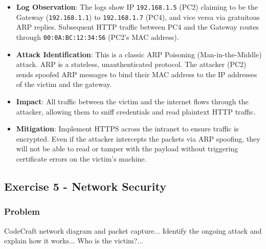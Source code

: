 \documentclass{article}
\begin{document}
\begin{itemize}
    \item \textbf{Log Observation}: The logs show IP \texttt{192.168.1.5} (PC2) claiming to be the Gateway (\texttt{192.168.1.1}) to \texttt{192.168.1.7} (PC4), and vice versa via gratuitous ARP replies. Subsequent HTTP traffic between PC4 and the Gateway routes through \texttt{00:0A:BC:12:34:56} (PC2's MAC address).
    \item \textbf{Attack Identification}: This is a classic ARP Poisoning (Man-in-the-Middle) attack. ARP is a stateless, unauthenticated protocol. The attacker (PC2) sends spoofed ARP messages to bind their MAC address to the IP addresses of the victim and the gateway.
    \item \textbf{Impact}: All traffic between the victim and the internet flows through the attacker, allowing them to sniff credentials and read plaintext HTTP traffic.
    \item \textbf{Mitigation}: Implement HTTPS across the intranet to ensure traffic is encrypted. Even if the attacker intercepts the packets via ARP spoofing, they will not be able to read or tamper with the payload without triggering certificate errors on the victim's machine.
\end{itemize}

\subsection{Exercise 5 - Network Security}
\subsubsection*{Problem}
CodeCraft network diagram and packet capture... Identify the ongoing attack and explain how it works... Who is the victim?...
\end{document}
